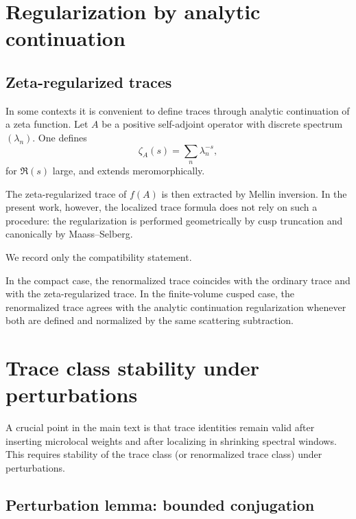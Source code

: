 \section{Regularization by analytic continuation}
\label{sec:L.zeta.reg}

\subsection{Zeta-regularized traces}
\label{subsec:L.zeta}

In some contexts it is convenient to define traces through analytic continuation of a zeta function.  Let $A$ be a
positive self-adjoint operator with discrete spectrum $(\lambda_n)$.
One defines
\[
\zeta_A(s)=\sum_n \lambda_n^{-s},
\]
for $\Re(s)$ large, and extends meromorphically.

The zeta-regularized trace of $f(A)$ is then extracted by Mellin inversion.  In the present work, however, the
localized trace formula does not rely on such a procedure: the regularization is performed geometrically by cusp
truncation and canonically by Maass--Selberg.

We record only the compatibility statement.

\begin{proposition}
\label{prop:L.compat.zeta}
In the compact case, the renormalized trace coincides with the ordinary trace and with the zeta-regularized trace.
In the finite-volume cusped case, the renormalized trace agrees with the analytic continuation regularization
whenever both are defined and normalized by the same scattering subtraction.
\end{proposition}

\section{Trace class stability under perturbations}
\label{sec:L.stability}

A crucial point in the main text is that trace identities remain valid after inserting microlocal weights and after
localizing in shrinking spectral windows.  This requires stability of the trace class (or renormalized trace class)
under perturbations.

\subsection{Perturbation lemma: bounded conjugation}
\label{subsec:L.conjugation}

